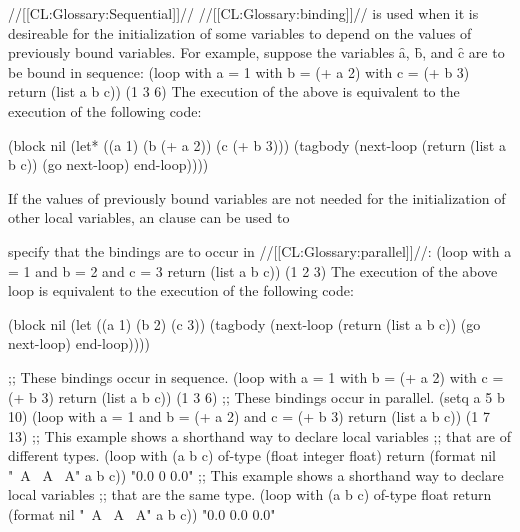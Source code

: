 //[[CL:Glossary:Sequential]]// //[[CL:Glossary:binding]]// is used when it is desireable for the initialization of some variables to depend on the values of previously bound variables. For example, suppose the variables \f{a}, \f{b}, and \f{c} are to be bound in sequence:
  \code
 (loop with a = 1 
       with b = (+ a 2) 
       with c = (+ b 3)
       return (list a b c)) \EV (1 3 6) \endcode
  The execution of the above  is equivalent to the execution of the following code:

\code
 (block nil
   (let* ((a 1)
          (b (+ a 2))
          (c (+ b 3)))
     (tagbody
         (next-loop (return (list a b c))
                    (go next-loop)
                    end-loop)))) \endcode

If the values of previously bound variables are not needed for the initialization of other local variables, an   clause can be used to 

specify that the bindings are to occur in //[[CL:Glossary:parallel]]//:
  \code
 (loop with a = 1 
       and b = 2 
       and c = 3
       return (list a b c)) \EV (1 2 3) \endcode
  The execution of the above loop is equivalent to the execution of the following code:

\code
 (block nil
   (let ((a 1)
         (b 2)
         (c 3))
     (tagbody
         (next-loop (return (list a b c))
                    (go next-loop)
                    end-loop)))) \endcode


\code ;; These bindings occur in sequence.
 (loop with a = 1 
       with b = (+ a 2) 
       with c = (+ b 3)
       return (list a b c)) \EV (1 3 6)
  ;; These bindings occur in parallel.
 (setq a 5 b 10) 
 (loop with a = 1
       and b = (+ a 2)
       and c = (+ b 3)
       return (list a b c)) \EV (1 7 13)
  ;; This example shows a shorthand way to declare local variables  ;; that are of different types.
 (loop with (a b c) of-type (float integer float)
       return (format nil "~A ~A ~A" a b c)) \EV "0.0 0 0.0"
  ;; This example shows a shorthand way to declare local variables  ;; that are the same type.
 (loop with (a b c) of-type float 
       return (format nil "~A ~A ~A" a b c)) \EV "0.0 0.0 0.0" \endcode

\endsubsubsubsection%

\endsubsubsection%


